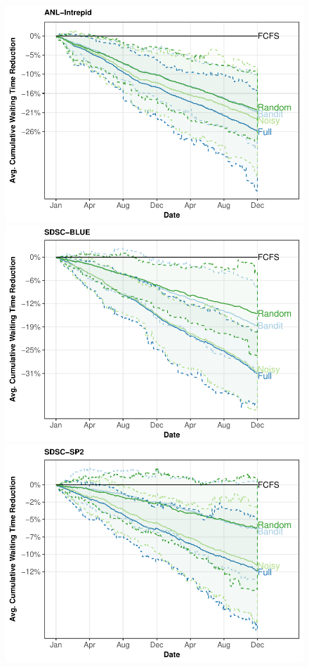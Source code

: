 \documentclass[sigconf]{acmart}
\begin{document}
\begin{figure}[h]
  \includegraphics[scale=0.6]{figures/CEA-Curi.pdf}
  \includegraphics[scale=0.6]{figures/SDSC-BLU.pdf}\\
  \includegraphics[scale=0.6]{figures/SDSC-SP2.pdf}

\end{figure}
\end{document}
